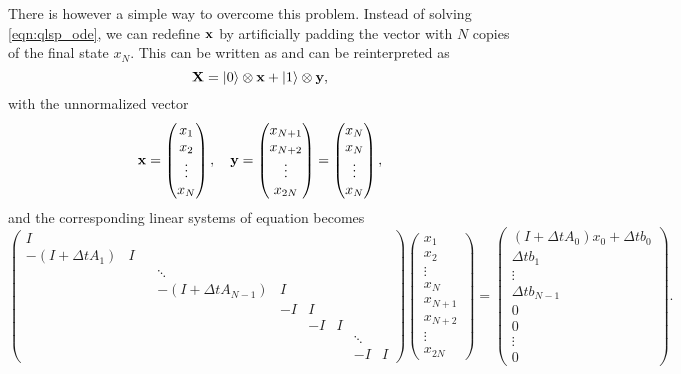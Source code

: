 There is however a simple way to overcome this problem.
Instead of solving \cref{eqn:qlsp_ode}, we can redefine $\mathbf{x}$ by artificially padding the vector with $N$ copies of the final state $x_N$. This can be written as
and can be reinterpreted as
\begin{equation}
\mathbf{X}=\ket{0}\otimes \mathbf{x}+\ket{1} \otimes \mathbf{y},
\end{equation}
with the unnormalized vector
\begin{equation}
\mathbf{x}=\begin{pmatrix}
x_1\\
x_2\\
\vdots\\
x_{N}
\end{pmatrix},
\quad
\mathbf{y}=\begin{pmatrix}
x_{N+1}\\
x_{N+2}\\
\vdots\\
x_{2N}
\end{pmatrix}=\begin{pmatrix}
x_{N}\\
x_{N}\\
\vdots\\
x_{N}
\end{pmatrix},
\end{equation}
and the corresponding linear systems of equation becomes
\begin{equation}
\begin{pmatrix}
I & \\
-(I+\Delta t A_1) & I \\
& & &\ddots\\
&  & & -(I+\Delta t A_{N-1}) & I\\
&&&&-I & I\\
&&&& &  -I& I \\
&&&& &  & & \ddots\\
&&&&&&&-I & I
\end{pmatrix}
\begin{pmatrix}
x_1\\
x_2\\
\vdots\\
x_{N}\\
x_{N+1}\\
x_{N+2}\\
\vdots\\
x_{2N}
\end{pmatrix}
=
\begin{pmatrix}
(I+\Delta t A_0)x_0+\Delta t b_0\\
\Delta t b_1\\
\vdots\\
\Delta t b_{N-1}\\
0\\
0\\
\vdots\\
0
\end{pmatrix}.
\label{eqn:modify_qsp_ode}
\end{equation}
